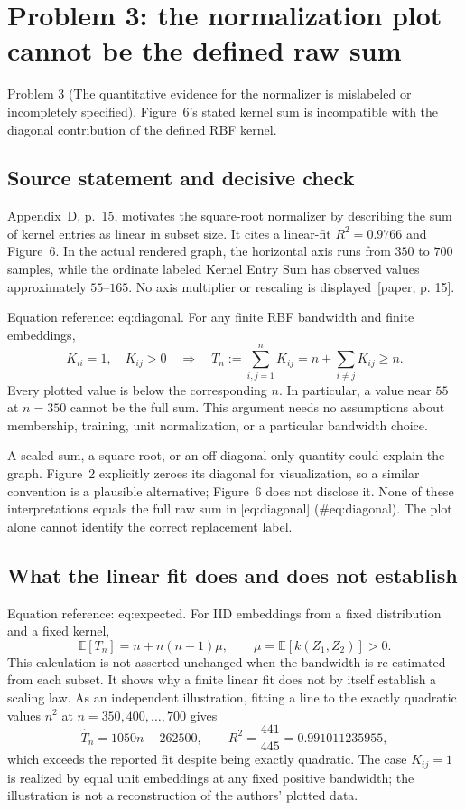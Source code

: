 \documentclass[10pt]{article}
\begin{document}
\section*{Problem 3: the normalization plot cannot be the defined raw sum}
Problem 3 (The quantitative evidence for the normalizer is mislabeled or incompletely specified).  Figure 6’s stated kernel sum is incompatible with the diagonal contribution of the defined RBF kernel.\par
\subsection*{Source statement and decisive check}
Appendix D, p. 15, motivates the square-root normalizer by describing the sum of kernel entries as linear in subset size. It cites a linear-fit \(R^2=0.9766\) and Figure 6. In the actual rendered graph, the horizontal axis runs from \(350\) to \(700\) samples, while the ordinate labeled Kernel Entry Sum has observed values approximately \(55\)–\(165\). No axis multiplier or rescaling is displayed [paper, p. 15].\par
Equation reference: eq:diagonal. For any finite RBF bandwidth and finite embeddings, \[
K_{ii}=1,\quad K_{ij}>0
\quad\Longrightarrow\quad
T_n:=\sum_{i,j=1}^{n}K_{ij}
=n+\sum_{i\ne j}K_{ij}\ge n.\] Every plotted value is below the corresponding \(n\). In particular, a value near \(55\) at \(n=350\) cannot be the full sum. This argument needs no assumptions about membership, training, unit normalization, or a particular bandwidth choice.\par
A scaled sum, a square root, or an off-diagonal-only quantity could explain the graph. Figure 2 explicitly zeroes its diagonal for visualization, so a similar convention is a plausible alternative; Figure 6 does not disclose it. None of these interpretations equals the full raw sum in [eq:diagonal] (\#eq:diagonal). The plot alone cannot identify the correct replacement label.\par
\subsection*{What the linear fit does and does not establish}
Equation reference: eq:expected. For IID embeddings from a fixed distribution and a fixed kernel, \[
\mathbb E[T_n]=n+n(n-1)\mu,\qquad
\mu=\mathbb E[k(Z_1,Z_2)]>0.\] This calculation is not asserted unchanged when the bandwidth is re-estimated from each subset. It shows why a finite linear fit does not by itself establish a scaling law. As an independent illustration, fitting a line to the exactly quadratic values \(n^2\) at \(n=350,400,\ldots,700\) gives \[\widehat T_n=1050n-262500,\qquad R^2=\frac{441}{445}
=0.991011235955,\] which exceeds the reported fit despite being exactly quadratic. The case \(K_{ij}=1\) is realized by equal unit embeddings at any fixed positive bandwidth; the illustration is not a reconstruction of the authors’ plotted data.\par
\end{document}
